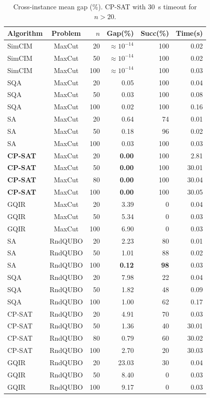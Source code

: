 \documentclass[10pt,twocolumn]{article}
\begin{document}
\begin{table}[t]
\centering\small
\caption{Cross-instance mean gap (\%). CP-SAT with 30~s timeout for $n>20$.}
\label{tab:main}
\begin{tabular}{lcrrrr}
\toprule
Algorithm & Problem & $n$ & Gap(\%) & Succ(\%) & Time(s)\\
\midrule
SimCIM & MaxCut & 20 & $\approx10^{-14}$ & 100 & 0.02\\
SimCIM & MaxCut & 50 & $\approx10^{-14}$ & 100 & 0.02\\
SimCIM & MaxCut & 100 & $\approx10^{-14}$ & 100 & 0.03\\
SQA & MaxCut & 20 & 0.05 & 100 & 0.04\\
SQA & MaxCut & 50 & 0.03 & 100 & 0.08\\
SQA & MaxCut & 100 & 0.02 & 100 & 0.16\\
SA & MaxCut & 20 & 0.64 & 74 & 0.01\\
SA & MaxCut & 50 & 0.18 & 96 & 0.02\\
SA & MaxCut & 100 & 0.03 & 100 & 0.03\\
\textbf{CP-SAT} & MaxCut & 20 & \textbf{0.00} & 100 & 2.81\\
\textbf{CP-SAT} & MaxCut & 50 & \textbf{0.00} & 100 & 30.01\\
\textbf{CP-SAT} & MaxCut & 80 & \textbf{0.00} & 100 & 30.04\\
\textbf{CP-SAT} & MaxCut & 100 & \textbf{0.00} & 100 & 30.05\\
GQIR & MaxCut & 20 & 3.39 & 0 & 0.04\\
GQIR & MaxCut & 50 & 5.34 & 0 & 0.03\\
GQIR & MaxCut & 100 & 6.90 & 0 & 0.03\\
\addlinespace
SA & RndQUBO & 20 & 2.23 & 80 & 0.01\\
SA & RndQUBO & 50 & 1.01 & 88 & 0.02\\
SA & RndQUBO & 100 & \textbf{0.12} & \textbf{98} & 0.03\\
SQA & RndQUBO & 20 & 7.98 & 22 & 0.04\\
SQA & RndQUBO & 50 & 1.82 & 48 & 0.09\\
SQA & RndQUBO & 100 & 1.00 & 62 & 0.17\\
CP-SAT & RndQUBO & 20 & 4.91 & 70 & 0.03\\
CP-SAT & RndQUBO & 50 & 1.36 & 40 & 30.01\\
CP-SAT & RndQUBO & 80 & 0.79 & 60 & 30.02\\
CP-SAT & RndQUBO & 100 & 2.70 & 20 & 30.03\\
GQIR & RndQUBO & 20 & 23.03 & 30 & 0.04\\
GQIR & RndQUBO & 50 & 8.40 & 0 & 0.03\\
GQIR & RndQUBO & 100 & 9.17 & 0 & 0.03\\
\bottomrule
\end{tabular}
\end{table}
\end{document}
